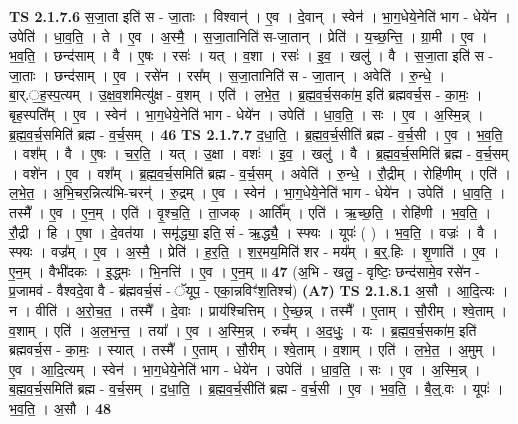 \documentclass[17pt]{extarticle}
\begin{document}
                  \newline
                                \textbf{ TS 2.1.7.6} \newline
                  स॒जा॒ता इति॑ स - जा॒ताः । विश्वान्॑ । ए॒व । दे॒वान् । स्वेन॑ । भा॒ग॒धेये॒नेति॑ भाग - धेये॑न । उपेति॑ । धा॒व॒ति॒ । ते । ए॒व । अ॒स्मै॒ । स॒जा॒तानिति॑ स-जा॒तान् । प्रेति॑ । य॒च्छ॒न्ति॒ । ग्रा॒मी । ए॒व । भ॒व॒ति॒ । छन्द॑साम् । वै । ए॒षः । रसः॑ । यत् । व॒शा । रसः॑ । इ॒व॒ । खलु॑ । वै । स॒जा॒ता इति॑ स - जा॒ताः । छन्द॑साम् । ए॒व । रसे॑न । रस᳚म् । स॒जा॒तानिति॑ स - जा॒तान् । अवेति॑ । रु॒न्धे॒ । बा॒र्.॒ह॒स्प॒त्यम् । उ॒क्ष॒व॒शमित्यु॑क्ष - व॒शम् । एति॑ । ल॒भे॒त॒ । ब्र॒ह्म॒व॒र्च॒सका॑म॒ इति॑ ब्रह्मवर्च॒स - का॒मः॒ । बृह॒स्पति᳚म् । ए॒व । स्वेन॑ । भा॒ग॒धेये॒नेति॑ भाग - धेये॑न । उपेति॑ । धा॒व॒ति॒ । सः । ए॒व । अ॒स्मि॒न्न् । ब्र॒ह्म॒व॒र्च॒समिति॑ ब्रह्म - व॒र्च॒सम् । \textbf{  46} \newline
                  \newline
                                \textbf{ TS 2.1.7.7} \newline
                  द॒धा॒ति॒ । ब्र॒ह्म॒व॒र्च॒सीति॑ ब्रह्म - व॒र्च॒सी । ए॒व । भ॒व॒ति॒ । वश᳚म् । वै । ए॒षः । च॒र॒ति॒ । यत् । उ॒क्षा । वशः॑ । इ॒व॒ । खलु॑ । वै । ब्र॒ह्म॒व॒र्च॒समिति॑ ब्रह्म - व॒र्च॒सम् । वशे॑न । ए॒व । वश᳚म् । ब्र॒ह्म॒व॒र्च॒समिति॑ ब्रह्म - व॒र्च॒सम् । अवेति॑ । रु॒न्धे॒ । रौ॒द्रीम् । रोहि॑णीम् । एति॑ । ल॒भे॒त॒ । अ॒भि॒चर॒न्नित्य॑भि-चरन्॑ । रु॒द्रम् । ए॒व । स्वेन॑ । भा॒ग॒धेये॒नेति॑ भाग - धेये॑न । उपेति॑ । धा॒व॒ति॒ । तस्मै᳚ । ए॒व । ए॒न॒म् । एति॑ । वृ॒श्च॒ति॒ । ता॒जक् । आर्ति᳚म् । एति॑ । ऋ॒च्छ॒ति॒ । रोहि॑णी । भ॒व॒ति॒ । रौ॒द्री । हि । ए॒षा । दे॒वत॑या । समृ॑द्ध्या॒ इति॒ सं - ऋ॒द्ध्यै॒ । स्फ्यः । यूपः॑ ( ) । भ॒व॒ति॒ । वज्रः॑ । वै । स्फ्यः । वज्र᳚म् । ए॒व । अ॒स्मै॒ । प्रेति॑ । ह॒र॒ति॒ । श॒र॒मय॒मिति॑ शर - मय᳚म् । ब॒र्॒.हिः । शृ॒णाति॑ । ए॒व । ए॒न॒म् । वैभी॑दकः । इ॒द्ध्मः । भि॒नत्ति॑ । ए॒व । ए॒न॒म् ॥ \textbf{  47} \newline
                  \newline
                      (अ॒भि - खलु॒ - वृष्टिः॒ छन्द॑सामे॒व रसे॑न - प्र॒जामव॑ - वैश्वदे॒वा वै - ब्र॑ह्मवर्च॒सं - ॅयूप॒ - एका॒न्नविꣳ॑श॒तिश्च॑)  \textbf{(A7)} \newline \newline
                                \textbf{ TS 2.1.8.1} \newline
                  अ॒सौ । आ॒दि॒त्यः । न । वीति॑ । अ॒रो॒च॒त॒ । तस्मै᳚ । दे॒वाः । प्राय॑श्चित्तिम् । ऐ॒च्छ॒न्न् । तस्मै᳚ । ए॒ताम् । सौ॒रीम् । श्वे॒ताम् । व॒शाम् । एति॑ । अ॒ल॒भ॒न्त॒ । तया᳚ । ए॒व । अ॒स्मि॒न्न् । रुच᳚म् । अ॒द॒धुः॒ । यः । ब्र॒ह्म॒व॒र्च॒सका॑म॒ इति॑ ब्रह्मवर्च॒स - का॒मः॒ । स्यात् । तस्मै᳚ । ए॒ताम् । सौ॒रीम् । श्वे॒ताम् । व॒शाम् । एति॑ । ल॒भे॒त॒ । अ॒मुम् । ए॒व । आ॒दि॒त्यम् । स्वेन॑ । भा॒ग॒धेये॒नेति॑ भाग - धेये॑न । उपेति॑ । धा॒व॒ति॒ । सः । ए॒व । अ॒स्मि॒न्न् । ब॒ह्म॒व॒र्च॒समिति॑ ब्रह्म - व॒र्च॒सम् । द॒धा॒ति॒ । ब्र॒ह्म॒व॒र्च॒सीति॑ ब्रह्म - व॒र्च॒सी । ए॒व । भ॒व॒ति॒ । बै॒ल्॒.वः । यूपः॑ । भ॒व॒ति॒ । अ॒सौ । \textbf{  48} \newline
\end{document}
